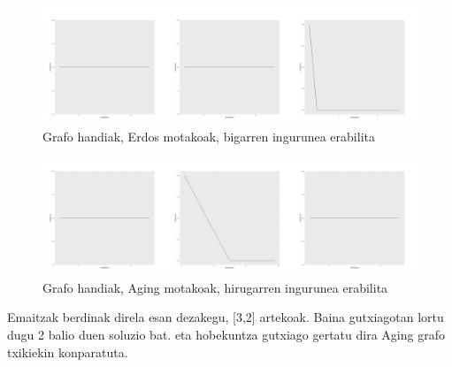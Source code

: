 \documentclass[eu,gi]{ifirak}\usepackage[]{graphicx}\usepackage[]{color}
\makeatletter
\def\maxwidth{ %
  \ifdim\Gin@nat@width>\linewidth
    \linewidth
  \else
    \Gin@nat@width
  \fi
}
\newenvironment{knitrout}{}{} %
\makeatother
\begin{document}
\begin{center}	
\begin{knitrout}
\color{fgcolor}\begin{figure}[!h]
\includegraphics[width=\maxwidth]{figure/unnamed-chunk-11-1} \caption[Grafo handiak, Erdos motakoak, bigarren ingurunea erabilita]{Grafo handiak, Erdos motakoak, bigarren ingurunea erabilita}\label{fig:unnamed-chunk-11}
\end{figure}


\end{knitrout}
\end{center}

\begin{center}	
\begin{knitrout}
\color{fgcolor}\begin{figure}[!h]
\includegraphics[width=\maxwidth]{figure/unnamed-chunk-12-1} \caption[Grafo handiak, Aging motakoak, hirugarren ingurunea erabilita]{Grafo handiak, Aging motakoak, hirugarren ingurunea erabilita}\label{fig:unnamed-chunk-12}
\end{figure}


\end{knitrout}
\end{center}
Emaitzak berdinak direla esan dezakegu, [3,2] artekoak. Baina gutxiagotan lortu dugu 2 balio duen soluzio bat. eta hobekuntza gutxiago gertatu dira  Aging grafo txikiekin konparatuta.\\
\end{document}
